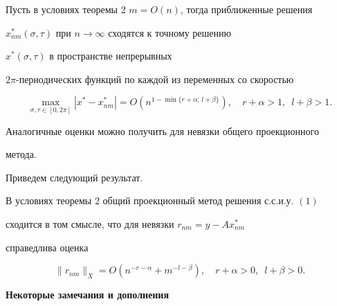  


\begin{cornonum} 


Пусть в условиях теоремы 2\; $m=O(n)$, тогда приближенные решения 


$x^*_{nm}(\sigma,\tau)$ при $n\to\infty$ сходятся к точному решению 


$x^*(\sigma,\tau)$ в пространстве непрерывных 


$2\pi$-периодических функций по каждой из переменных со скоростью 


$$ 


\max_{\sigma,\tau\in[0,2\pi]}|x^*-x^*_{nm}|= 


O(n^{1-\min\{r+\alpha;\,l+\beta\}}),\quad 


r+\alpha>1,\ \; l+\beta>1. 


$$ 


\end{cornonum} 


 


Аналогичные оценки можно получить для невязки общего проекционного 


метода. 


 


Приведем следующий результат. 


 


\begin{thm} 


В условиях теоремы $2$ общий проекционный метод решения с.с.и.у. $(1)$ 


сходится в том смысле, что для невязки $r_{nm}=y-A x^*_{nm}$ 


справедлива оценка 


$$ 


\|r_{nm}\|_X=O(n^{-r-\alpha}+m^{-l-\beta}),\quad 


r+\alpha>0,\ \; l+\beta>0.


$$ 


\end{thm} 


\pagebreak


 


\begin{center} 


\bf{Некоторые замечания и дополнения} 


\end{center} 


